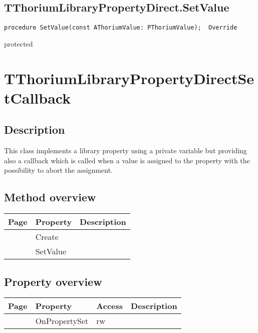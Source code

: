 \subsection{TThoriumLibraryPropertyDirect.SetValue}
\label{thoriumcorepkg:thorium:tthoriumlibrarypropertydirect:setvalue}
\begin{FPCList}
\Declaration 

\begin{verbatim}
procedure SetValue(const AThoriumValue: PThoriumValue);  Override
\end{verbatim}
\Visibility
protected
\end{FPCList}
\section{TThoriumLibraryPropertyDirectSetCallback}
\label{thoriumcorepkg:thorium:tthoriumlibrarypropertydirectsetcallback}
\subsection{Description}
This class implements a library property using a private variable but providing also a callback which is called when a value is assigned to the property with the possibility to abort the assignment.%
\subsection{Method overview}
\label{thoriumcorepkg:thorium:tthoriumlibrarypropertydirectsetcallback:methods}
\begin{tabularx}{\textwidth}{llX}
Page & Property & Description  \\ \hline
\pageref{thoriumcorepkg:thorium:tthoriumlibrarypropertydirectsetcallback:create} & Create  &  \\
\pageref{thoriumcorepkg:thorium:tthoriumlibrarypropertydirectsetcallback:setvalue} & SetValue  &  \\
\hline
\end{tabularx}
\subsection{Property overview}
\label{thoriumcorepkg:thorium:tthoriumlibrarypropertydirectsetcallback:properties}
\begin{tabularx}{\textwidth}{lllX}
Page & Property & Access & Description \\ \hline
\pageref{thoriumcorepkg:thorium:tthoriumlibrarypropertydirectsetcallback:onpropertyset} & OnPropertySet & rw &  \\
\hline
\end{tabularx}
